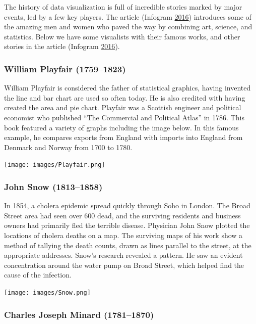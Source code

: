 \documentclass[]{book}
\begin{document}
The history of data visualization is full of incredible stories marked by major events, led by a few key players. The article (Infogram \protect\hyperlink{ref-history_viz}{2016}) introduces some of the amazing men and women who paved the way by combining art, science, and statistics. Below we have some visualists with their famous works, and other stories in the article (Infogram \protect\hyperlink{ref-history_viz}{2016}).

\hypertarget{william-playfair-17591823}{%
\subsubsection{William Playfair (1759--1823)}\label{william-playfair-17591823}}

William Playfair is considered the father of statistical graphics, having invented the line and bar chart are used so often today. He is also credited with having created the area and pie chart. Playfair was a Scottish engineer and political economist who published ``The Commercial and Political Atlas'' in 1786. This book featured a variety of graphs including the image below. In this famous example, he compares exports from England with imports into England from Denmark and Norway from 1700 to 1780.

\texttt{[image: images/Playfair.png]}

\hypertarget{john-snow-18131858}{%
\subsubsection{John Snow (1813--1858)}\label{john-snow-18131858}}

In 1854, a cholera epidemic spread quickly through Soho in London. The Broad Street area had seen over 600 dead, and the surviving residents and business owners had primarily fled the terrible disease. Physician John Snow plotted the locations of cholera deaths on a map. The surviving maps of his work show a method of tallying the death counts, drawn as lines parallel to the street, at the appropriate addresses. Snow's research revealed a pattern. He saw an evident concentration around the water pump on Broad Street, which helped find the cause of the infection.

\texttt{[image: images/Snow.png]}

\hypertarget{charles-joseph-minard-17811870}{%
\subsubsection{Charles Joseph Minard (1781--1870)}\label{charles-joseph-minard-17811870}}
\end{document}

